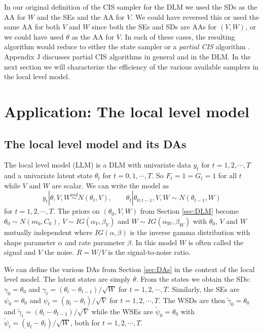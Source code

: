 \documentclass[12pt]{article}
\begin{document}
In our original definition of the CIS sampler for the DLM we used the SDs as the AA for $W$ and the SEs and the AA for $V$. We could have reversed this or used the same AA for both $V$ and $W$ since both the SEs and SDs are AAs for $(V,W)$, or we could have used $\theta$ as the AA for $V$. In each of these cases, the resulting algorithm would reduce to either the state sampler or a {\it partial CIS} algorithm \citep{yu2011center}. Appendix J discusses partial CIS algorithms in general and in the DLM. In the next section we will characterize the efficiency of the various available samplers in the local level model.

\section{Application: The local level model}\label{sec:LLM}

\subsection{The local level model and its DAs}

The local level model (LLM) is a DLM with univariate data $y_t$ for $t=1,2,\cdots,T$ and a univariate latent state $\theta_t$ for $t=0,1,\cdots,T$. So $F_t=1=G_t=1$ for all $t$ while $V$ and $W$ are scalar. We can write the model as \vspace{-.3cm}
\[
  y_t |\theta,V,W \stackrel{ind}{\sim} N(\theta_t,V), \qquad
  \theta_t |\theta_{0:t-1},V,W \sim N(\theta_{t-1},W)
\]
for $t=1,2,\cdots,T$. The priors on $(\theta_0,V,W)$ from Section \ref{sec:DLM} become $\theta_0\sim N(m_0,C_0)$, $V\sim IG(\alpha_V,\beta_V)$ and $W\sim IG(\alpha_W,\beta_W)$ with $\theta_0$, $V$ and $W$ mutually independent where $IG(\alpha,\beta)$ is the inverse gamma distribution with shape parameter $\alpha$ and rate parameter $\beta$. In this model $W$ is often called the signal and $V$ the noise. $R=W/V$ is the signal-to-noise ratio.

We can define the various DAs from Section \ref{sec:DAs} in the context of the local level model. The latent states are simply $\theta$. From the states we obtain the SDs: $\gamma_0=\theta_0$ and $\gamma_t = (\theta_t - \theta_{t-1})/\sqrt{W}$ for $t=1,2,\cdots,T$. Similarly, the SEs are $\psi_0=\theta_0$ and $\psi_t = (y_t - \theta_t)/\sqrt{V}$ for $t=1,2,\cdots,T$. The WSDs are then $\tilde{\gamma}_{0}=\theta_0$ and $\tilde{\gamma}_t = (\theta_t - \theta_{t-1})/\sqrt{V}$ while the WSEs are $\tilde{\psi}_0=\theta_0$ with $\tilde{\psi}_t = (y_t - \theta_t)/\sqrt{W}$, both for $t=1,2,\cdots,T$. 
\end{document}
